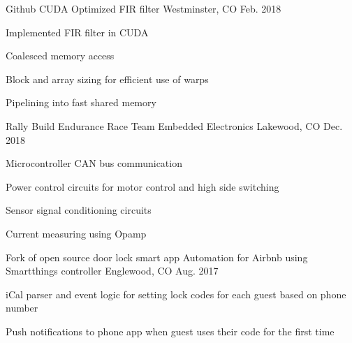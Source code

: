 

\begin{cventries}

  \cventry
    {Github}
    {CUDA Optimized FIR filter}
    {Westminster, CO} %
    {Feb. 2018} %
    {
      \begin{cvitems} %
        \item {Implemented FIR filter in CUDA}
        \item {Coalesced memory access}
        \item {Block and array sizing for efficient use of warps}
        \item {Pipelining into fast shared memory}
      \end{cvitems}
    }

  \cventry
    {Rally Build Endurance Race Team}
    {Embedded Electronics}
    {Lakewood, CO} %
    {Dec. 2018} %
    {
      \begin{cvitems} %
        \item {Microcontroller CAN bus communication}
        \item {Power control circuits for motor control and high side switching}
        \item {Sensor signal conditioning circuits}
        \item {Current measuring using Opamp}
      \end{cvitems}
    }

  \cventry
    {Fork of open source door lock smart app}
    {Automation for Airbnb using Smartthings controller}
    {Englewood, CO} %
    {Aug. 2017} %
    {
      \begin{cvitems} %
        \item {iCal parser and event logic for setting lock codes for each guest based on phone number}
        \item {Push notifications to phone app when guest uses their code for the first time}
      \end{cvitems}
    }


\end{cventries}
